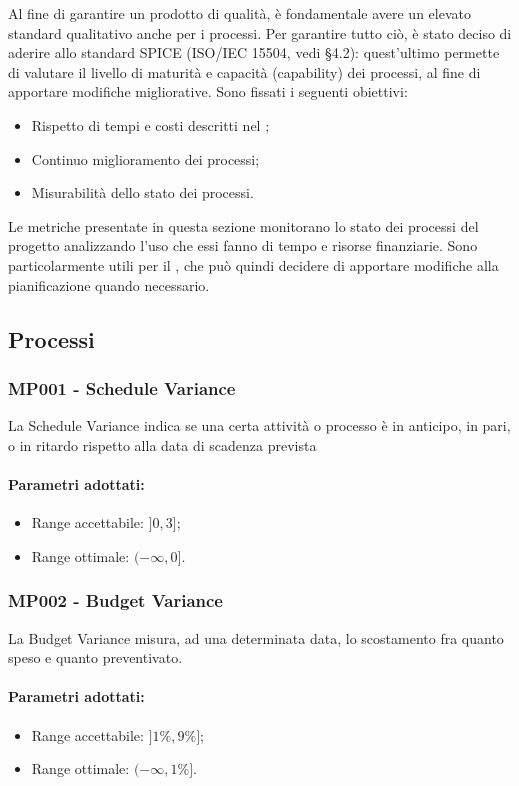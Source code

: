 Al fine di garantire un prodotto di qualità, è fondamentale avere un elevato 
standard qualitativo anche per i processi. Per garantire tutto ciò, 
è stato deciso di aderire allo standard {SPICE} (ISO/IEC 15504, vedi \NdP \space §4.2): quest'ultimo permette 
di valutare il livello di {maturità} e capacità ({capability}) 
dei processi, al fine di apportare modifiche migliorative.\newline
Sono fissati i seguenti obiettivi:
\begin{itemize}
	\item Rispetto di tempi e costi descritti nel \PdP ;
	\item Continuo miglioramento dei processi;
	\item Misurabilità dello stato dei processi.
\end{itemize}

    Le metriche presentate in questa sezione monitorano lo stato dei processi del progetto analizzando l'uso che essi fanno di tempo e risorse finanziarie. Sono particolarmente utili per il \Res , che può quindi decidere di apportare modifiche alla pianificazione quando necessario.
    \subsection{Processi}
    \subsubsection{MP001 - Schedule Variance}\mbox{}
        La Schedule Variance indica se una certa attività o processo è in anticipo, in pari, o in ritardo rispetto alla data di scadenza prevista
        \paragraph{Parametri adottati:}
        \begin{itemize}
            \item Range accettabile: $ ]0 , 3]$;
            \item Range ottimale: $(-\infty , 0]$.
        \end{itemize}

    \subsubsection{MP002 - Budget Variance}\mbox{}
        La Budget Variance misura, ad una determinata data, lo scostamento fra quanto speso e quanto preventivato. 
        \paragraph{Parametri adottati:}
        \begin{itemize}
            \item Range accettabile: $]1\% , 9\%]$;
            \item Range ottimale: $(-\infty , 1\%]$.
        \end{itemize}